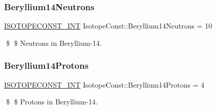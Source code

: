 \subsubsection{\texorpdfstring{Beryllium14\+Neutrons}{Beryllium14Neutrons}}
{\footnotesize\ttfamily \mbox{\hyperlink{group___isotope_const-_macros_ga5f18360b3e99483a35c32d789e62621c}{I\+S\+O\+T\+O\+P\+E\+C\+O\+N\+S\+T\+\_\+\+I\+NT}} Isotope\+Const\+::\+Beryllium14\+Neutrons = 10}

\$ \$ Neutrons in Beryllium-\/14. \mbox{\label{group___isotope_const-_beryllium-_be14_ga59ea3ad66098e699ba3a8217a3b1ba76}} 
\subsubsection{\texorpdfstring{Beryllium14\+Protons}{Beryllium14Protons}}
{\footnotesize\ttfamily \mbox{\hyperlink{group___isotope_const-_macros_ga5f18360b3e99483a35c32d789e62621c}{I\+S\+O\+T\+O\+P\+E\+C\+O\+N\+S\+T\+\_\+\+I\+NT}} Isotope\+Const\+::\+Beryllium14\+Protons = 4}

\$ \$ Protons in Beryllium-\/14. 
